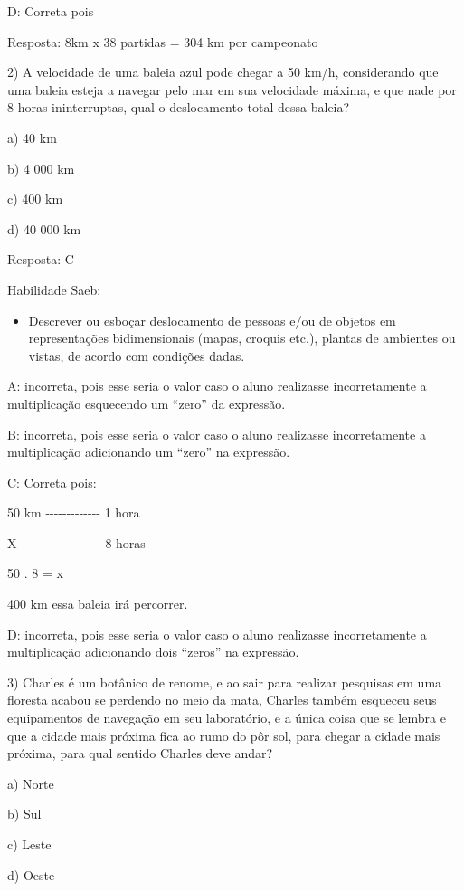 D: Correta pois

Resposta: 8km x 38 partidas = 304 km por campeonato

2) A velocidade de uma baleia azul pode chegar a 50 km/h, considerando
que uma baleia esteja a navegar pelo mar em sua velocidade máxima, e que
nade por 8 horas ininterruptas, qual o deslocamento total dessa baleia?

a) 40 km

b) 4 000 km

c) 400 km

d) 40 000 km

Resposta: C

Habilidade Saeb:

\begin{itemize}
\tightlist
\item
  Descrever ou esboçar deslocamento de pessoas e/ou de objetos em
  representações bidimensionais (mapas, croquis etc.), plantas de
  ambientes ou vistas, de acordo com condições dadas.
\end{itemize}

A: incorreta, pois esse seria o valor caso o aluno realizasse
incorretamente a multiplicação esquecendo um ``zero'' da expressão.

B: incorreta, pois esse seria o valor caso o aluno realizasse
incorretamente a multiplicação adicionando um ``zero'' na expressão.

C: Correta pois:

50 km -\/-\/-\/-\/-\/-\/-\/-\/-\/-\/-\/-\/- 1 hora

X -\/-\/-\/-\/-\/-\/-\/-\/-\/-\/-\/-\/-\/-\/-\/-\/-\/-\/- 8 horas

50 . 8 = x

400 km essa baleia irá percorrer.

D: incorreta, pois esse seria o valor caso o aluno realizasse
incorretamente a multiplicação adicionando dois ``zeros'' na expressão.

3) Charles é um botânico de renome, e ao sair para realizar pesquisas em
uma floresta acabou se perdendo no meio da mata, Charles também esqueceu
seus equipamentos de navegação em seu laboratório, e a única coisa que
se lembra e que a cidade mais próxima fica ao rumo do pôr sol, para
chegar a cidade mais próxima, para qual sentido Charles deve andar?

a) Norte

b) Sul

c) Leste

d) Oeste

